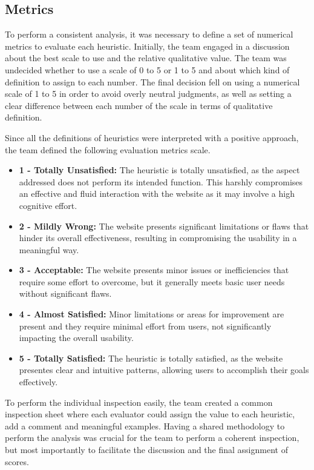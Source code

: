 
\subsection{Metrics}

To perform a consistent analysis, it was necessary to define a set of numerical metrics to evaluate each heuristic.
Initially, the team engaged in a discussion about the best scale to use and the relative qualitative value. The team was undecided whether to use a scale of 0 to 5 or 1 to 5 and about which kind of definition to assign to each number.
The final decision fell on using a numerical scale of 1 to 5 in order to avoid overly neutral judgments, as well as setting a clear difference between each number of the scale in terms of qualitative definition. 

Since all the definitions of heuristics were interpreted with a positive approach, the team defined the following evaluation metrics scale.
\begin{itemize}
    \item \textbf{1 - Totally Unsatisfied:} The heuristic is totally unsatisfied, as the aspect addressed does not perform its intended function. This harshly compromises an effective and fluid interaction with the website as it may involve a high cognitive effort.
    \item \textbf{2 - Mildly Wrong:} The website presents significant limitations or flaws that hinder its overall effectiveness, resulting in compromising the usability in a meaningful way.
    \item \textbf{3 - Acceptable:} The website presents minor issues or inefficiencies that require some effort to overcome, but it generally meets basic user needs without significant flaws.
    \item \textbf{4 - Almost Satisfied:} Minor limitations or areas for improvement are present and they require minimal effort from users, not significantly impacting the overall usability.
    \item \textbf{5 - Totally Satisfied:} The heuristic is totally satisfied, as the website presentes clear and intuitive patterns, allowing users to accomplish their goals effectively.
\end{itemize}

To perform the individual inspection easily, the team created a common inspection sheet where each evaluator could assign the value to each heuristic, add a comment and meaningful examples. Having a shared methodology to perform the analysis was crucial for the team to perform a coherent inspection, but most importantly to facilitate the discussion and the final assignment of scores.